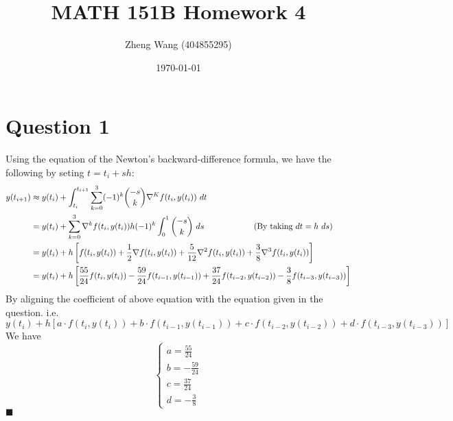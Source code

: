 \documentclass[11pt]{article}
\author{Zheng Wang (404855295)}
\date{\today}
\title{MATH 151B Homework 4}
\begin{document}
	

\maketitle
\section*{Question 1}
Using the equation of the Newton's backward-difference formula, we have the following by seting $ t = t_i + sh $:
\begin{align*}
y(t_{i+1}) &\approx y(t_i) + \int_{t_i}^{t_{i+1}}\sum_{k=0}^{3}(-1)^k {-s \choose k} \nabla^K f(t_i,y(t_i))\ dt\\
&=y(t_i) + \sum_{k=0}^{3}\nabla^kf(t_i,y(t_i))h(-1)^k\int_{0}^{1} {-s \choose k}\ ds \qquad\qquad\qquad \text{(By taking $ dt = h\ ds $)}\\
&=y(t_i) + h\left[ f(t_i,y(t_i)) + \frac{1}{2}\nabla f(t_i,y(t_i)) + \frac{5}{12} \nabla^2 f(t_i, y(t_i)) + \frac{3}{8} \nabla^3 f(t_i, y(t_i)) \right]\\
&=y(t_i) + h\left[ \frac{55}{24}f(t_i,y(t_i)) - \frac{59}{24}f(t_{i-1},y(t_{i-1})) + \frac{37}{24}f(t_{i-2},y(t_{i-2})) -\frac{3}{8}f(t_{i-3},y(t_{i-3}))\right]
\end{align*}
By aligning the coefficient of above equation with the equation given in the question. i.e.
\[ y(t_i) + h\left[ a\cdot f(t_i,y(t_i)) +b\cdot f(t_{i-1},y(t_{i-1})) + c\cdot f(t_{i-2},y(t_{i-2})) + d\cdot f(t_{i-3},y(t_{i-3}))\right] \]
We have 
\[ \begin{cases}
a = \frac{55}{24}\\
b = -\frac{59}{24}\\
c = \frac{37}{24}\\
d = -\frac{3}{8}
\end{cases} \] \hfill $\blacksquare$
\end{document}
